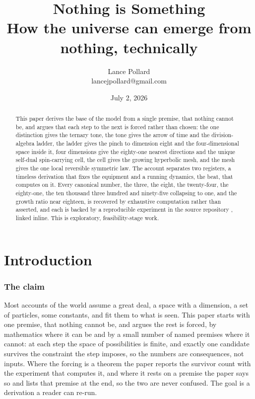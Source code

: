 \documentclass{article}
\title{{\huge \textbf{Nothing is Something}}\\[3mm]
  \large How the universe can emerge from nothing, technically}
\author{Lance Pollard \\ \small lancejpollard@gmail.com}
\date{July 2, 2026}
\begin{document}
\maketitle
\thispagestyle{plain}

\begin{abstract}
This paper derives the base of the model from a single premise, that nothing cannot be, and
argues that each step to the next is forced rather than chosen: the one distinction gives the
ternary tone, the tone gives the arrow of time and the division-algebra ladder, the ladder gives
the pinch to dimension eight and the four-dimensional space inside it, four dimensions give the
eighty-one nearest directions and the unique self-dual spin-carrying cell, the cell gives the
growing hyperbolic mesh, and the mesh gives the one local reversible symmetric law. The account
separates two registers, a timeless derivation that fixes the equipment and a running dynamics,
the beat, that computes on it. Every canonical number, the three, the eight, the twenty-four, the
eighty-one, the ten thousand three hundred and ninety-five collapsing to one, and the growth ratio
near eighteen, is recovered by exhaustive computation rather than asserted, and each is backed by a
reproducible experiment in the source repository \cite{cluesurf2026repo}, linked inline. This is
exploratory, feasibility-stage work.
\end{abstract}

\part{Introduction}

\section{The claim}

Most accounts of the world assume a great deal, a space with a dimension, a set of particles, some
constants, and fit them to what is seen. This paper starts with one premise, that nothing cannot
be, and argues the rest is forced, by mathematics where it can be and by a small number of named
premises where it cannot: at each step the space of possibilities is finite, and exactly one
candidate survives the constraint the step imposes, so the numbers are consequences, not inputs.
Where the forcing is a theorem the paper reports the survivor count with the experiment that
computes it, and where it rests on a premise the paper says so and lists that premise at the end,
so the two are never confused. The goal is a derivation a reader can re-run.
\end{document}

